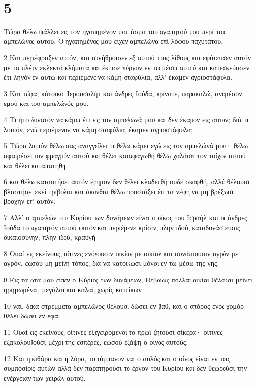 \chapter{5}

\par Τώρα θέλω ψάλλει εις τον ηγαπημένον μου άσμα του αγαπητού μου περί του αμπελώνος αυτού. Ο ηγαπημένος μου είχεν αμπελώνα επί λόφου παχυτάτου.
\par 2 Και περιέφραξεν αυτόν, και συνήθροισεν εξ αυτού τους λίθους και εφύτευσεν αυτόν με τα πλέον εκλεκτά κλήματα και έκτισε πύργον εν τω μέσω αυτού και κατεσκεύασεν έτι ληνόν εν αυτώ και περιέμενε να κάμη σταφύλια, αλλ' έκαμεν αγριοστάφυλα.
\par 3 Και τώρα, κάτοικοι Ιερουσαλήμ και άνδρες Ιούδα, κρίνατε, παρακαλώ, αναμέσον εμού και του αμπελώνός μου.
\par 4 Τι ήτο δυνατόν να κάμω έτι εις τον αμπελώνά μου και δεν έκαμον εις αυτόν; διά τι λοιπόν, ενώ περιέμενον να κάμη σταφύλια, έκαμεν αγριοστάφυλα;
\par 5 Τώρα λοιπόν θέλω σας αναγγείλει τι θέλω κάμει εγώ εις τον αμπελώνά μου· θέλω αφαιρέσει τον φραγμόν αυτού και θέλει καταφαγωθή θέλω χαλάσει τον τοίχον αυτού και θέλει καταπατηθή·
\par 6 και θέλω καταστήσει αυτόν έρημον δεν θέλει κλαδευθή ουδέ σκαφθή, αλλά θέλουσι βλαστήσει εκεί τρίβολοι και άκανθαι θέλω προστάξει έτι τα νέφη να μη βρέξωσι βροχήν επ' αυτόν.
\par 7 Αλλ' ο αμπελών του Κυρίου των δυνάμεων είναι ο οίκος του Ισραήλ και οι άνδρες Ιούδα το αγαπητόν αυτού φυτόν και περιέμενε κρίσιν, πλην ιδού, καταδυνάστευσις δικαιοσύνην, πλην ιδού, κραυγή.
\par 8 Ουαί εις εκείνους, οίτινες ενόνουσιν οικίαν με οικίαν και συνάπτουσιν αγρόν με αγρόν, εωσού μη μείνη τόπος, διά να κατοικώσι μόνοι εν τω μέσω της γης.
\par 9 Εις τα ώτα μου είπεν ο Κύριος των δυνάμεων, Βεβαίως πολλαί οικίαι θέλουσι μείνει ηρημωμέναι, μεγάλαι και καλαί, χωρίς κατοίκων
\par 10 ναι, δέκα στρέμματα αμπελώνος θέλουσι δώσει εν βαθ, και ο σπόρος ενός χομόρ θέλει δώσει εν εφά.
\par 11 Ουαί εις εκείνους, οίτινες εξεγειρόμενοι το πρωΐ ζητούσι σίκερα· οίτινες εξακολουθούσι μέχρι της εσπέρας, εωσού εξάψη ο οίνος αυτούς.
\par 12 Και η κιθάρα και η λύρα, το τύμπανον και ο αυλός και ο οίνος είναι εν τοις συμποσίοις αυτών αλλά δεν παρατηρούσι το έργον του Κυρίου και δεν θεωρούσι την ενέργειαν των χειρών αυτού.
